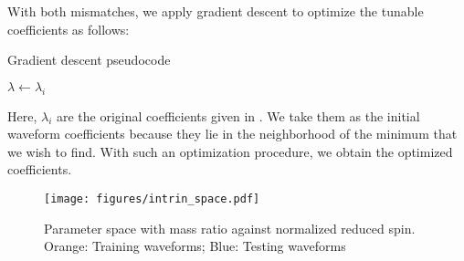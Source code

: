 \documentclass[twocolumn]{aastex631}
\begin{document}
With both mismatches, we apply gradient descent to optimize the tunable
coefficients as follows: 
\begin{algorithm}
	\caption{Gradient descent pseudocode}
	    $\lambda\leftarrow\lambda_i$\\
	 \Return{$\lambda$}
\end{algorithm}
Here, $\lambda_i$ are the original coefficients given in
\citep{khan2016frequency}. We take them as the initial waveform coefficients
because they lie in the neighborhood of the minimum that we wish to find. With
such an optimization procedure, we obtain the optimized coefficients. 

\begin{figure}[t]
	\centering
	\texttt{[image: figures/intrin\_space.pdf]}
	\caption{Parameter space with mass ratio against normalized reduced spin. Orange: Training waveforms; Blue: Testing waveforms}
	\label{fig:intrin_space}
\end{figure}
\end{document}
